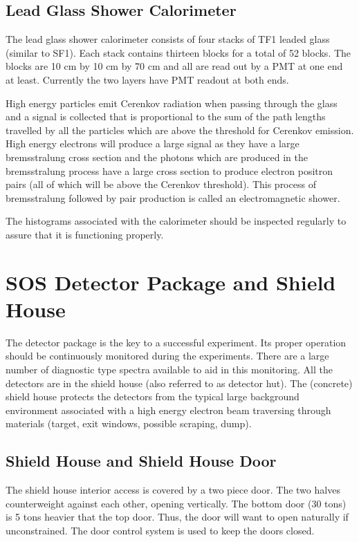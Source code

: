 \subsection{Lead Glass Shower Calorimeter}

The lead glass shower calorimeter consists of four stacks of
TF1 leaded glass (similar to SF1). Each stack contains thirteen
blocks for a total of 52 blocks. The blocks are 10 cm by 10 cm by 70
cm and all are read out by a PMT at one end at least.  Currently the
two layers have PMT readout at both ends.

High energy particles
emit Cerenkov radiation when passing through the glass and a signal
is collected that is proportional to the sum of the path lengths
travelled by all the
particles which are above the threshold for Cerenkov emission. High energy
electrons will produce a large signal as they have a large bremsstralung
cross section and the photons which are produced in the bremsstralung
process have a large cross section to produce electron positron pairs
(all of which will be above the Cerenkov threshold). This process
of bremsstralung followed by pair production is called an electromagnetic
shower.

The histograms associated with the calorimeter should be inspected
regularly to assure that it is functioning properly.


\section{SOS Detector Package and Shield House }

The detector package is the key to a successful experiment. Its proper
operation should be continuously monitored during the experiments.
There are a large number of diagnostic type spectra available to aid in
this monitoring.
All the detectors are in the shield house (also referred to as detector hut).
The (concrete) shield house protects the detectors from the typical large
background environment associated with a high energy electron beam
traversing through materials (target, exit windows, possible scraping, dump).

\subsection{Shield House and Shield House Door}

The shield house interior access is covered by a two piece door. The two
halves counterweight against each other, opening vertically. The bottom
door (30 tons) is 5 tons heavier that the top door. Thus, the door will want
to open naturally if unconstrained. The door control system is used to keep
the doors closed.

